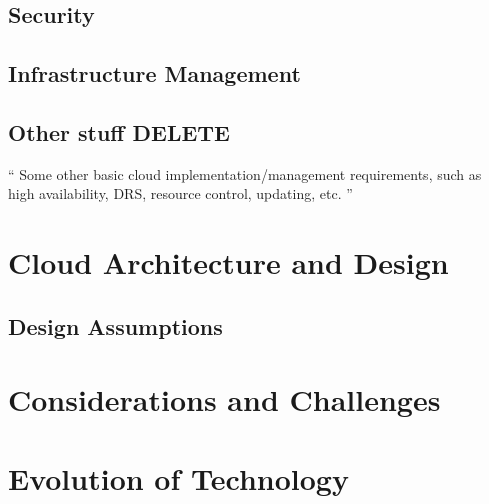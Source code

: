\documentclass[]{article}
\begin{document}
\subsection{Security}

\subsection{Infrastructure Management}

\subsection{Other stuff DELETE}
`` Some other basic cloud implementation/management requirements, such as high availability, DRS,
resource control, updating, etc. ''

\section{Cloud Architecture and Design}

\subsection{Design Assumptions}

\section{Considerations and Challenges}

\section{Evolution of Technology}
\end{document}
